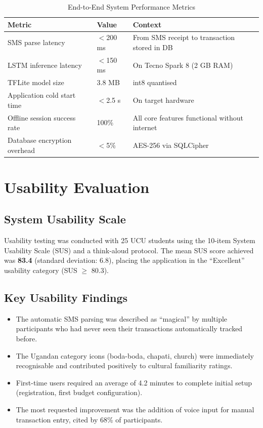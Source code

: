 \documentclass[12pt,a4paper]{report}
\begin{document}
\begin{table}[H]
\centering
\caption{End-to-End System Performance Metrics}
\label{tab:system_perf}
\begin{tabular}{p{5.5cm} p{3cm} p{4cm}}
\toprule
\textbf{Metric} & \textbf{Value} & \textbf{Context} \\
\midrule
SMS parse latency           & $<$200 ms & From SMS receipt to transaction stored in DB \\
LSTM inference latency      & $<$150 ms & On Tecno Spark 8 (2 GB RAM) \\
TFLite model size           & 3.8 MB    & int8 quantised \\
Application cold start time & $<$2.5 s  & On target hardware \\
Offline session success rate & 100\%     & All core features functional without internet \\
Database encryption overhead & $<$5\%    & AES-256 via SQLCipher \\
\bottomrule
\end{tabular}
\end{table}

\section{Usability Evaluation}

\subsection{System Usability Scale}

Usability testing was conducted with 25 UCU students using the 10-item System
Usability Scale (SUS) and a think-aloud protocol. The mean SUS score achieved was
\textbf{83.4} (standard deviation: 6.8), placing the application in the ``Excellent''
usability category (SUS $\geq$ 80.3).

\subsection{Key Usability Findings}

\begin{itemize}
    \item The automatic SMS parsing was described as ``magical'' by multiple participants who had never seen their transactions automatically tracked before.
    \item The Ugandan category icons (boda-boda, chapati, church) were immediately recognisable and contributed positively to cultural familiarity ratings.
    \item First-time users required an average of 4.2 minutes to complete initial setup (registration, first budget configuration).
    \item The most requested improvement was the addition of voice input for manual transaction entry, cited by 68\% of participants.
\end{itemize}
\end{document}
